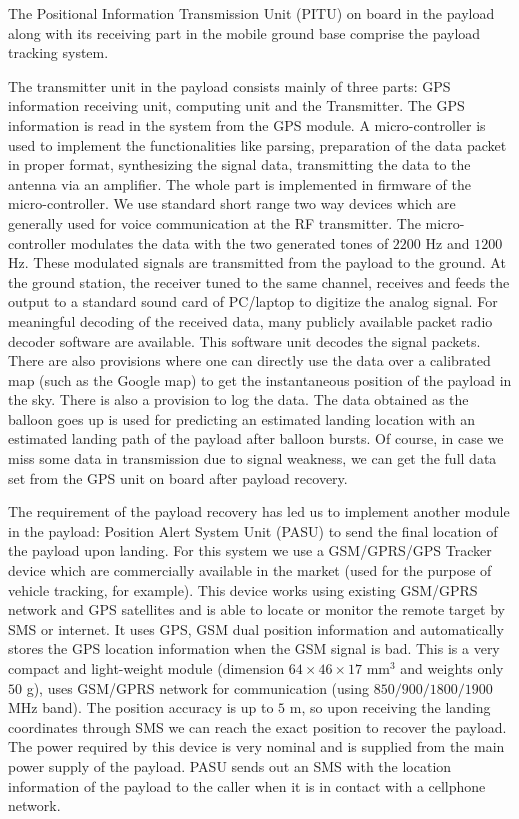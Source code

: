 The Positional Information Transmission Unit (PITU) on board in the payload
along with its receiving part in the mobile ground base comprise the payload
tracking system.

The transmitter unit in the payload consists mainly of three parts: GPS information
receiving unit, computing unit and the Transmitter. The GPS information 
is read in the system from the GPS module. A micro-controller is
used to implement the functionalities like parsing, preparation of the data
packet in proper format, synthesizing the signal data, transmitting the
data to the antenna via an amplifier. The whole part is implemented in firmware
of the micro-controller. We use standard short range two way devices which
are generally used for voice communication at the RF transmitter. The
micro-controller modulates the data with the two generated tones of $2200$ Hz and
$1200$ Hz. These modulated signals are transmitted from the payload to the ground. At
the ground station, the receiver tuned to the same channel, receives and feeds the output 
to a standard sound card of PC/laptop to digitize the analog signal. For
meaningful decoding of the received data, many publicly available packet radio decoder
software are available. This software unit decodes the signal packets. 
There are also provisions where one can 
directly use the data over a calibrated map (such as the Google map) 
to get the instantaneous position of the payload in the sky. 
There is also a provision to log the data. The data
obtained as the balloon goes up is used for predicting an estimated landing
location with an estimated landing path of the payload after balloon bursts. 
Of course, in case we miss some data in transmission due to signal weakness,
we can get the full data set from the GPS unit on board after payload recovery.

The requirement of the payload recovery has led us to implement another module in
the payload: Position Alert System Unit (PASU) to send the final location of
the payload upon landing. For this system we use a GSM/GPRS/GPS Tracker device
which are commercially available in the market (used for the purpose of vehicle
tracking, for example). This device works using existing GSM/GPRS network and GPS
satellites and is able to locate or monitor the remote target by SMS or
internet. It uses GPS, GSM dual position information and automatically stores the
GPS location information when the GSM signal is bad. This is a very compact and
light-weight module (dimension $64 \times 46 \times 17$ mm$^3$ and weights
only $50$ g), uses GSM/GPRS network for communication (using $850/900/1800/1900$ MHz
band). The position accuracy is up to $5$ m, so upon receiving the landing  coordinates
through SMS we can reach the exact position to recover the payload. The power
required by this device is very nominal and is supplied from the main power
supply of the payload. 
PASU sends out an SMS with the location information of the payload to the caller
when it is in contact with a cellphone network.

